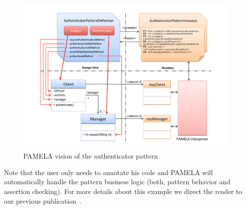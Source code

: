 \begin{figure}
    \centering
    \includegraphics[width=1.0 \columnwidth]{figures/AuthenticatorPattern4.pdf}
    \caption{PAMELA vision of the authenticator pattern}
    \label{fig:AuthenticatorPattern}
\end{figure}

Note that the user only needs to annotate his code and PAMELA will automatically handle the pattern business logic (both, pattern behavior and assertion checking). For more details about this example we direct the reader to our previous publication~\cite{silva2020contract}.

